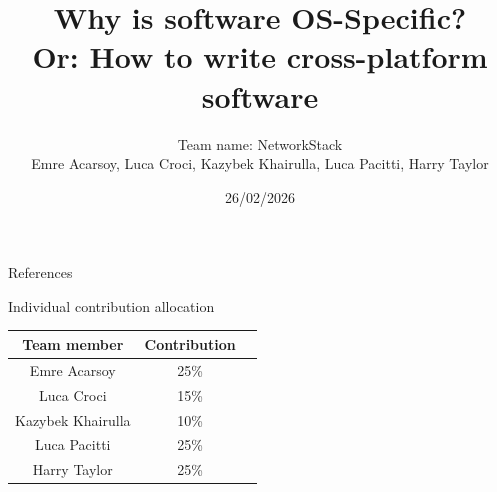 \documentclass[aspectratio=169]{beamer}
\title{Why is software OS-Specific?\\[0.3em]
\large Or: How to write cross-platform software}
\author{Team name: NetworkStack\\ \footnotesize{Emre Acarsoy, Luca Croci, Kazybek Khairulla, Luca Pacitti, Harry Taylor}}
\institute{University of Exeter}
\date{26/02/2026}
\begin{document}
\frame{\titlepage}


















\begin{frame}[allowframebreaks]{References}
\printbibliography
\end{frame}

\begin{frame}{Individual contribution allocation}
\centering
\begin{tabular}{|c|c|c|}
\hline
Team member & Contribution \\ \hline
Emre Acarsoy & 25\% \\ \hline
Luca Croci & 15\% \\ \hline
Kazybek Khairulla & 10\% \\ \hline
Luca Pacitti & 25\% \\ \hline
Harry Taylor & 25\% \\ \hline
\end{tabular}
\end{frame}
\end{document}
